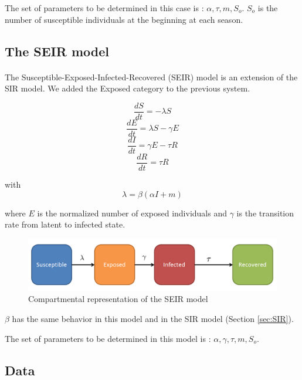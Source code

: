 \documentclass[11pt, a4paper]{article}
\begin{document}
The set of parameters to be determined in this case is : $ {\alpha, \tau, m, S_o}$. $S_o$ is the number of susceptible individuals at the beginning at each season.

\subsection{The SEIR model}
\paragraph{}
The Susceptible-Exposed-Infected-Recovered (SEIR) model is an extension of the SIR model. We added the Exposed category to the previous system.

\begin{equation}
\frac{dS}{dt} = - \lambda S
\end{equation}
\begin{equation}
\frac{dE}{dt} = \lambda S - \gamma E
\end{equation}
\begin{equation}
\frac{dI}{dt} = \gamma E - \tau R
\end{equation}
\begin{equation}
\frac{dR}{dt} = \tau R
\end{equation}

with \[ \lambda = \beta (\alpha I + m) \]

where $E$ is the normalized number of exposed individuals and $\gamma$ is the transition rate from latent to infected state.

\begin{figure}[h]
\FloatBarrier
\center
   \includegraphics[width = \textwidth]{figures/picture2.png}
   \caption{Compartmental representation of the SEIR model}
   \label{SEIRcr}
\end{figure}

$\beta$ has the same behavior in this model and in the SIR model (Section \ref{sec:SIR}).

The set of parameters to be determined in this model is : $ { \alpha, \gamma, \tau, m, S_o}$. 

\subsection{Data}
\end{document}

